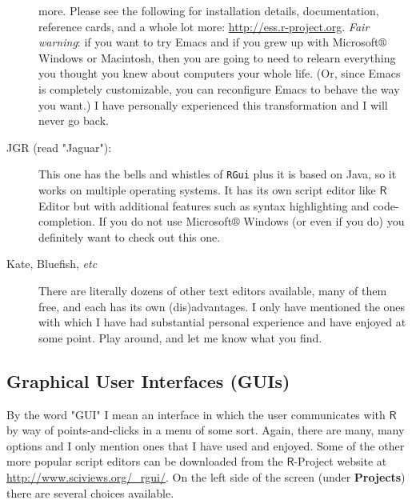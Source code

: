 \begin{description}
more. Please see the following for installation
details, documentation, reference cards, and a whole
lot more: \url{http://ess.r-project.org}.  \emph{Fair warning}:
if you want to try Emacs and if you grew up with
Microsoft\(\circledR\) Windows or Macintosh, then you
are going to need to relearn everything you thought
you knew about computers your whole life. (Or, since
Emacs is completely customizable, you can reconfigure
Emacs to behave the way you want.) I have personally
experienced this transformation and I will never go
back.
\item[{JGR (read "Jaguar"):}]  This one has the bells
and whistles of \texttt{RGui} plus it is based on Java, so it works on
multiple operating systems. It has its own script editor like
\(\mathsf{R}\) Editor but with additional features such as syntax
highlighting and code-completion. If you do not use
Microsoft\(\circledR\) Windows (or even if you do) you definitely
want to check out this one.
\item[{Kate, Bluefish, \emph{etc}}] There are literally dozens of other text
editors available, many of them free, and each has its own
(dis)advantages. I only have mentioned the ones with which I have
had substantial personal experience and have enjoyed at some
point. Play around, and let me know what you find.
\end{description}

\subsection{Graphical User Interfaces (GUIs)}
\label{sec-2-2-3}

By the word "GUI" I mean an interface in which the user communicates
with \(\mathsf{R}\) by way of points-and-clicks in a menu of some
sort. Again, there are many, many options and I only mention ones that
I have used and enjoyed. Some of the other more popular script editors
can be downloaded from the \(\mathsf{R}\)-Project website at
\url{http://www.sciviews.org/_rgui/}. On the left side of the screen
(under \textbf{Projects}) there are several choices available.

